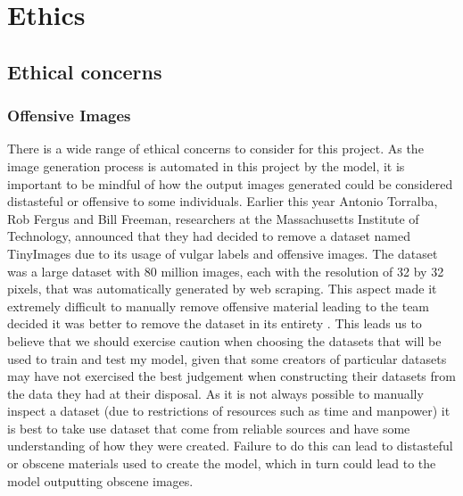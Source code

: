 \chapter{Ethics}
\label{ch:3ethics}

\section{Ethical concerns}
\label{sec:ethicalconcerns}
\subsection{Offensive Images}
\label{subsec:offensiveimages}
There is a wide range of ethical concerns to consider for this project. As the image generation process is automated in this project by the model, it is important to be mindful of how the output images generated could be considered distasteful or offensive to some individuals. Earlier this year Antonio Torralba, Rob Fergus and Bill Freeman, researchers at the Massachusetts Institute of Technology, announced that they had decided to remove a dataset named TinyImages due to its usage of vulgar labels and offensive images. The dataset was a large dataset with 80 million images, each with the resolution of 32 by 32 pixels, that was automatically generated by web scraping. This aspect made it extremely difficult to manually remove offensive material leading to the team decided it was better to remove the dataset in its entirety \cite{tinyimages}. This leads us to believe that we should exercise caution when choosing the datasets that will be used to train and test my model, given that some creators of particular datasets may have not exercised the best judgement when constructing their datasets from the data they had at their disposal. As it is not always possible to manually inspect a dataset (due to restrictions of resources such as time and manpower) it is best to take use dataset that come from reliable sources and have some understanding of how they were created. Failure to do this can lead to distasteful or obscene materials used to create the model, which in turn could lead to the model outputting obscene images. 


